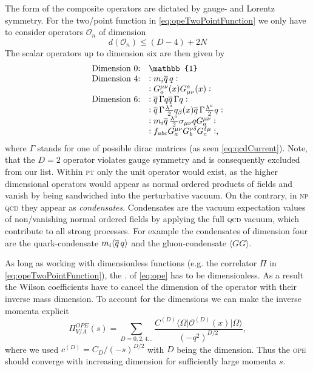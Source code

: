 \documentclass[../../index.tex]{subfiles}
\begin{document}
The form of the composite operators are dictated by gauge- and Lorentz symmetry.
For the two\-/point function in \cref{eq:opeTwoPointFunction} we only have to
consider operators \(\mathcal{O}_n\) of dimension
\begin{equation}
  d \left( \mathcal{O}_n \right) \leq (D - 4) + 2N
\end{equation}
The scalar operators up to dimension six are then given by \cite{Pascual1984}
\begin{equation}
  \begin{array}{ll}
    \text{Dimension 0:} & \mathbb{1} \\
    \text{Dimension 4:} & :m_i \anti{q} q: \\
                        & :G_a^{\mu\nu}(x) G_{\mu\nu}^a(x): \\
    \text{Dimension 6:} & :\anti{q} \Gamma q \anti{q} \Gamma q: \\
                        & :\anti{q} \Gamma \frac{\lambda^a}{2} q_\beta(x) \anti{q} \Gamma \frac{\lambda^a}{2} q: \\
                        & :m_i \anti{q} \frac{\lambda^a}{2} \sigma_{\mu\nu} q G^{\mu\nu}_a: \\
                        & :f_{abc} G_a^{\mu\nu} G_b^{\nu\delta} G_c^{\delta\mu}:,
  \end{array}
\end{equation}
where \(\Gamma\) stands for one of possible dirac matrices (as seen
\cref{eq:qcdCurrent}). Note, that the \(D=2\) operator violates gauge symmetry
and is consequently excluded from our list. Within \textsc{pt} only the unit
operator would exist, as the higher dimensional operators would appear as normal
ordered products of fields and vanish by being sandwiched into the perturbative
vacuum. On the contrary, in \textsc{np qcd} they appear as \textit{condensates}.
Condensates are the vacuum expectation values of non\-/vanishing normal ordered
fields by applying the full \textsc{qcd} vacuum, which contribute to all strong
processes. For example the condensates of dimension four are the
quark-condensate \(m_i\langle \overline{q}\, q \rangle\) and the gluon-condensate
\(\langle GG \rangle\).

As long as working with dimensionless functions (e.g. the correlator \(\Pi\) in
\cref{eq:opeTwoPointFunction}), the . of
\cref{eq:ope} has to be dimensionless. As a result the Wilson coefficients have
to cancel the dimension of the operator with their inverse mass dimension. To
account for the dimensions we can make the inverse momenta explicit
\begin{equation}
  \Pi_{V/A}^{OPE}(s) = \sum_{D=0,2,4\dots} \frac{C^{(D)}
    \langle\Omega\vert \mathcal{O}^{(D)}(x) \vert\Omega\rangle}{(-q^2)^{D/2}},
\end{equation}
where we used \(c^{(D)}=C_D/(-s)^{D/2}\) with \(D\) being the dimension. Thus the
\textsc{ope} should converge with increasing dimension for sufficiently large
momenta \(s\).
\end{document}
